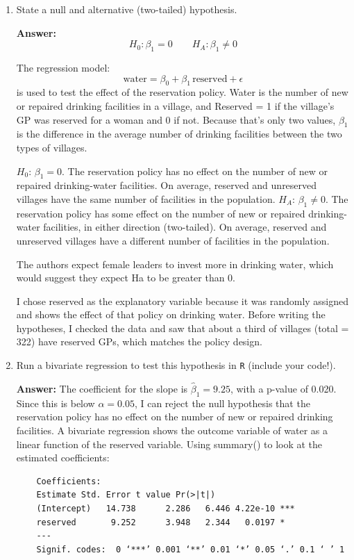 \documentclass[12pt,letterpaper]{article}
\begin{document}
\newpage
\begin{enumerate}
	\vspace{1cm}
	\item [(a)] State a null and alternative (two-tailed) hypothesis. 
	
	\noindent \textbf{Answer:} \[ H_0: \beta_1 = 0 \qquad H_A: \beta_1 \neq 0 \] 
	
	\noindent The regression model: \[ \text{water} = \beta_0 + \beta_1 \, \text{reserved} + \epsilon \] is used to test the effect of the reservation policy. Water is the number of new or repaired drinking facilities in a village, and Reserved = 1 if the village's GP was reserved for a woman and 0 if not. Because that’s only two values, $\beta_1$ is the difference in the average number of drinking facilities between the two types of villages. 
	
	$H_0$: $\beta_1 = 0$. The reservation policy has no effect on the number of new or repaired drinking-water facilities. On average, reserved and unreserved villages have the same number of facilities in the population.
	$H_A$: $\beta_1 \neq 0$. The reservation policy has some effect on the number of new or repaired drinking-water facilities, in either direction (two-tailed). On average, reserved and unreserved villages have a different number of facilities in the population.
	
	The authors expect female leaders to invest more in drinking water, which would suggest they expect Ha to be greater than 0. 
	
	I chose reserved as the explanatory variable because it was randomly assigned and shows the effect of that policy on drinking water. Before writing the hypotheses, I checked the data and saw that about a third of villages (total = 322) have reserved GPs, which matches the policy design.
	
	\vspace{1cm}
	\item [(b)] Run a bivariate regression to test this hypothesis in \texttt{R} (include your code!).
	
	\noindent \textbf{Answer:} The coefficient for the slope is $\hat{\beta}_1 = 9.25$, with a p-value of 0.020. Since this is below $\alpha = 0.05$, I can reject the null hypothesis that the reservation policy has no effect on the number of new or repaired drinking facilities. 
	\noindent A bivariate regression shows the outcome variable of water as a linear function of the reserved variable. Using summary() to look at the estimated coefficients:
\begin{verbatim}
	Coefficients:
	Estimate Std. Error t value Pr(>|t|)    
	(Intercept)   14.738      2.286   6.446 4.22e-10 ***
	reserved       9.252      3.948   2.344   0.0197 *  
	---
	Signif. codes:  0 ‘***’ 0.001 ‘**’ 0.01 ‘*’ 0.05 ‘.’ 0.1 ‘ ’ 1
	

\end{verbatim}
\end{enumerate}
\end{document}
